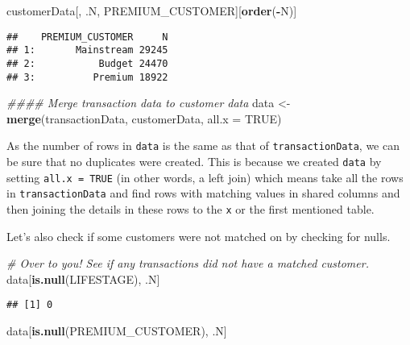 \documentclass[]{article}
\newenvironment{Shaded}{\begin{snugshade}}{\end{snugshade}}
\newcommand{\CommentTok}[1]{\textcolor[rgb]{0.56,0.35,0.01}{\textit{#1}}}
\newcommand{\DataTypeTok}[1]{\textcolor[rgb]{0.13,0.29,0.53}{#1}}
\newcommand{\KeywordTok}[1]{\textcolor[rgb]{0.13,0.29,0.53}{\textbf{#1}}}
\newcommand{\NormalTok}[1]{#1}
\newcommand{\OperatorTok}[1]{\textcolor[rgb]{0.81,0.36,0.00}{\textbf{#1}}}
\newcommand{\OtherTok}[1]{\textcolor[rgb]{0.56,0.35,0.01}{#1}}
\newcommand{\StringTok}[1]{\textcolor[rgb]{0.31,0.60,0.02}{#1}}
\begin{document}
\begin{Shaded}
\begin{Highlighting}[]
\NormalTok{customerData[, .N, PREMIUM_CUSTOMER][}\KeywordTok{order}\NormalTok{(}\OperatorTok{-}\NormalTok{N)]}
\end{Highlighting}
\end{Shaded}

\begin{verbatim}
##    PREMIUM_CUSTOMER     N
## 1:       Mainstream 29245
## 2:           Budget 24470
## 3:          Premium 18922
\end{verbatim}

\begin{Shaded}
\begin{Highlighting}[]
\CommentTok{#### Merge transaction data to customer data}
\NormalTok{data <-}\StringTok{ }\KeywordTok{merge}\NormalTok{(transactionData, customerData, }\DataTypeTok{all.x =} \OtherTok{TRUE}\NormalTok{)}
\end{Highlighting}
\end{Shaded}

As the number of rows in \texttt{data} is the same as that of
\texttt{transactionData}, we can be sure that no duplicates were
created. This is because we created \texttt{data} by setting
\texttt{all.x\ =\ TRUE} (in other words, a left join) which means take
all the rows in \texttt{transactionData} and find rows with matching
values in shared columns and then joining the details in these rows to
the \texttt{x} or the first mentioned table.

Let's also check if some customers were not matched on by checking for
nulls.

\begin{Shaded}
\begin{Highlighting}[]
\CommentTok{# Over to you! See if any transactions did not have a matched customer.}
\NormalTok{data[}\KeywordTok{is.null}\NormalTok{(LIFESTAGE), .N]}
\end{Highlighting}
\end{Shaded}

\begin{verbatim}
## [1] 0
\end{verbatim}

\begin{Shaded}
\begin{Highlighting}[]
\NormalTok{data[}\KeywordTok{is.null}\NormalTok{(PREMIUM_CUSTOMER), .N]}
\end{Highlighting}
\end{Shaded}
\end{document}
